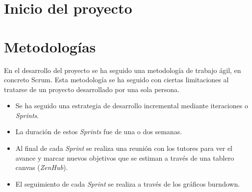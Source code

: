 
\begin{comment}
Este apartado pretende recoger los aspectos más interesantes del desarrollo del proyecto, comentados por los autores del mismo.
Debe incluir desde la exposición del ciclo de vida utilizado, hasta los detalles de mayor relevancia de las fases de análisis, diseño e implementación.
Se busca que no sea una mera operación de copiar y pegar diagramas y extractos del código fuente, sino que realmente se justifiquen los caminos de solución que se han tomado, especialmente aquellos que no sean triviales.
Puede ser el lugar más adecuado para documentar los aspectos más interesantes del diseño y de la implementación, con un mayor hincapié en aspectos tales como el tipo de arquitectura elegido, los índices de las tablas de la base de datos, normalización y desnormalización, distribución en ficheros3, reglas de negocio dentro de las bases de datos (EDVHV GH GDWRV DFWLYDV), aspectos de desarrollo relacionados con el WWW...
Este apartado, debe convertirse en el resumen de la experiencia práctica del proyecto, y por sí mismo justifica que la memoria se convierta en un documento útil, fuente de referencia para los autores, los tutores y futuros alumnos.
\end{comment}

\section{Inicio del proyecto}

\section{Metodologías}
En el desarrollo del proyecto se ha seguido una metodología de trabajo ágil, en concreto Scrum. Esta metodología se ha seguido con ciertas limitaciones al tratarse de un proyecto desarrollado por una sola persona.
\begin{itemize}
	\item Se ha seguido una estrategia de desarrollo incremental mediante iteraciones o \emph{Sprints}.
	\item La duración de estos \emph{Sprints} fue de una o dos semanas.
	\item Al final de cada \emph{Sprint} se realiza una reunión con los tutores para ver el avance y marcar nuevos objetivos que se estiman a través de una tablero canvas (\emph{ZenHub}).
	\item El seguimiento de cada \emph{Sprint} se realiza a través de los gráficos burndown.
\end{itemize}
	 
